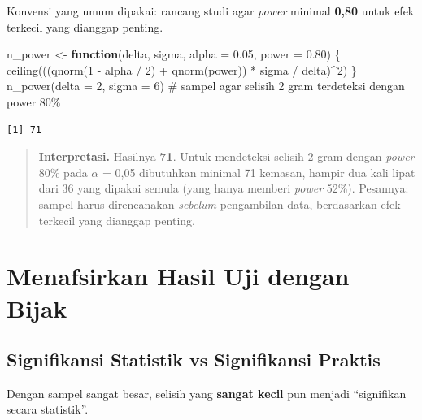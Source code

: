 \documentclass[
  indonesian,
  letterpaper,
]{book}
\newenvironment{Shaded}{\begin{snugshade}}{\end{snugshade}}
\newcommand{\AttributeTok}[1]{\textcolor[rgb]{0.40,0.45,0.13}{#1}}
\newcommand{\CommentTok}[1]{\textcolor[rgb]{0.37,0.37,0.37}{#1}}
\newcommand{\ControlFlowTok}[1]{\textcolor[rgb]{0.00,0.23,0.31}{\textbf{#1}}}
\newcommand{\DecValTok}[1]{\textcolor[rgb]{0.68,0.00,0.00}{#1}}
\newcommand{\FloatTok}[1]{\textcolor[rgb]{0.68,0.00,0.00}{#1}}
\newcommand{\FunctionTok}[1]{\textcolor[rgb]{0.28,0.35,0.67}{#1}}
\newcommand{\NormalTok}[1]{\textcolor[rgb]{0.00,0.23,0.31}{#1}}
\newcommand{\OtherTok}[1]{\textcolor[rgb]{0.00,0.23,0.31}{#1}}
\newcommand{\SpecialCharTok}[1]{\textcolor[rgb]{0.37,0.37,0.37}{#1}}
\begin{document}
Konvensi yang umum dipakai: rancang studi agar \emph{power} minimal
\textbf{0,80} untuk efek terkecil yang dianggap penting.

\begin{Shaded}
\begin{Highlighting}[]
\NormalTok{n\_power }\OtherTok{\textless{}{-}} \ControlFlowTok{function}\NormalTok{(delta, sigma, }\AttributeTok{alpha =} \FloatTok{0.05}\NormalTok{, }\AttributeTok{power =} \FloatTok{0.80}\NormalTok{) \{}
  \FunctionTok{ceiling}\NormalTok{(((}\FunctionTok{qnorm}\NormalTok{(}\DecValTok{1} \SpecialCharTok{{-}}\NormalTok{ alpha }\SpecialCharTok{/} \DecValTok{2}\NormalTok{) }\SpecialCharTok{+} \FunctionTok{qnorm}\NormalTok{(power)) }\SpecialCharTok{*}\NormalTok{ sigma }\SpecialCharTok{/}\NormalTok{ delta)}\SpecialCharTok{\^{}}\DecValTok{2}\NormalTok{)}
\NormalTok{\}}
\FunctionTok{n\_power}\NormalTok{(}\AttributeTok{delta =} \DecValTok{2}\NormalTok{, }\AttributeTok{sigma =} \DecValTok{6}\NormalTok{)   }\CommentTok{\# sampel agar selisih 2 gram terdeteksi dengan power 80\%}
\end{Highlighting}
\end{Shaded}

\begin{verbatim}
[1] 71
\end{verbatim}

\begin{quote}
\textbf{Interpretasi.} Hasilnya \textbf{71}. Untuk mendeteksi selisih 2
gram dengan \emph{power} 80\% pada \(\alpha\) = 0,05 dibutuhkan minimal
71 kemasan, hampir dua kali lipat dari 36 yang dipakai semula (yang
hanya memberi \emph{power} 52\%). Pesannya: sampel harus direncanakan
\emph{sebelum} pengambilan data, berdasarkan efek terkecil yang dianggap
penting.
\end{quote}

\section{Menafsirkan Hasil Uji dengan
Bijak}\label{menafsirkan-hasil-uji-dengan-bijak}

\subsection{Signifikansi Statistik vs Signifikansi
Praktis}\label{signifikansi-statistik-vs-signifikansi-praktis}

Dengan sampel sangat besar, selisih yang \textbf{sangat kecil} pun
menjadi ``signifikan secara statistik''.
\end{document}
